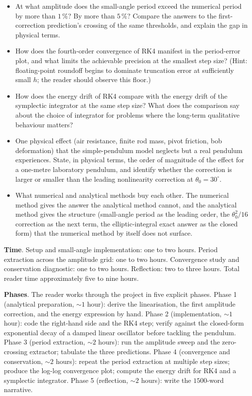 \begin{project}
\begin{itemize}[leftmargin=*]
  \item At what amplitude does the small-angle period exceed the
    numerical period by more than $1\,\%$? By more than $5\,\%$?
    Compare the answers to the first-correction prediction's
    crossing of the same thresholds, and explain the gap in
    physical terms.
  \item How does the fourth-order convergence of RK4 manifest in
    the period-error plot, and what limits the achievable
    precision at the smallest step size? (Hint: floating-point
    roundoff begins to dominate truncation error at sufficiently
    small $h$; the reader should observe this floor.)
  \item How does the energy drift of RK4 compare with the energy
    drift of the symplectic integrator at the same step size?
    What does the comparison say about the choice of integrator
    for problems where the long-term qualitative behaviour
    matters?
  \item One physical effect (air resistance, finite rod mass,
    pivot friction, bob deformation) that the simple-pendulum
    model neglects but a real pendulum experiences. State, in
    physical terms, the order of magnitude of the effect for a
    one-metre laboratory pendulum, and identify whether the
    correction is larger or smaller than the leading
    nonlinearity correction at $\theta_{0} = 30^{\circ}$.
  \item What numerical and analytical methods buy each other.
    The numerical method gives the answer the analytical method
    cannot, and the analytical method gives the structure
    (small-angle period as the leading order, the
    $\theta_{0}^{2}/16$ correction as the next term, the
    elliptic-integral exact answer as the closed form) that the
    numerical method by itself does not surface.
\end{itemize}

\textbf{Time}. Setup and small-angle implementation: one to two
hours. Period extraction across the amplitude grid: one to two
hours. Convergence study and conservation diagnostic: one to two
hours. Reflection: two to three hours. Total reader time
approximately five to nine hours.

\textbf{Phases}. The reader works through the project in five
explicit phases. Phase 1 (analytical preparation, $\sim 1$ hour):
derive the linearisation, the first amplitude correction, and the
energy expression by hand. Phase 2 (implementation, $\sim 1$
hour): code the right-hand side and the RK4 step; verify against
the closed-form exponential decay of a damped linear oscillator
before tackling the pendulum. Phase 3 (period extraction, $\sim
2$ hours): run the amplitude sweep and the zero-crossing
extractor; tabulate the three predictions. Phase 4 (convergence
and conservation, $\sim 2$ hours): repeat the period extraction at
multiple step sizes; produce the log-log convergence plot; compute
the energy drift for RK4 and a symplectic integrator. Phase 5
(reflection, $\sim 2$ hours): write the $1500$-word narrative.


\end{project}
